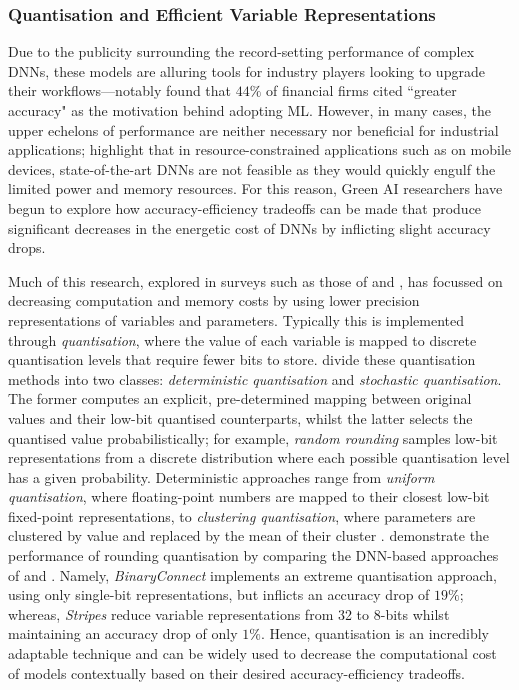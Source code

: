 \documentclass[a4paper, 11pt]{report}
\begin{document}
    \subsubsection{Quantisation and Efficient Variable Representations}
    \label{section: quantisation}

    Due to the publicity surrounding the record-setting performance of complex DNNs, these models are alluring tools for industry players looking to upgrade their workflows—notably \citet{chartis-2019} found that $44\%$ of financial firms cited ``greater accuracy" as the motivation behind adopting ML. However, in many cases, the upper echelons of performance are neither necessary nor beneficial for industrial applications; \citet{kumar-2020} highlight that in resource-constrained applications such as on mobile devices, state-of-the-art DNNs are not feasible as they would quickly engulf the limited power and memory resources. For this reason, Green AI researchers have begun to explore how accuracy-efficiency tradeoffs can be made that produce significant decreases in the energetic cost of DNNs by inflicting slight accuracy drops.

    Much of this research, explored in surveys such as those of \citet{xu-2021} and \citet{cai-2022}, has focussed on decreasing computation and memory costs by using lower precision representations of variables and parameters. Typically this is implemented through \emph{quantisation}, where the value of each variable is mapped to discrete quantisation levels that require fewer bits to store. \citet{xu-2021} divide these quantisation methods into two classes: \emph{deterministic quantisation} and \emph{stochastic quantisation}. The former computes an explicit, pre-determined mapping between original values and their low-bit quantised counterparts, whilst the latter selects the quantised value probabilistically; for example, \emph{random rounding} samples low-bit representations from a discrete distribution where each possible quantisation level has a given probability. Deterministic approaches range from \emph{uniform quantisation}, where floating-point numbers are mapped to their closest low-bit fixed-point representations, to \emph{clustering quantisation}, where parameters are clustered by value and replaced by the mean of their cluster \citep{xu-2021}. \citet{kumar-2020} demonstrate the performance of rounding quantisation by comparing the DNN-based approaches of \citet{courbariaux-2015} and \citet{judd-2016}. Namely, \emph{BinaryConnect} \citep{courbariaux-2015} implements an extreme quantisation approach, using only single-bit representations, but inflicts an accuracy drop of $19\%$; whereas, \emph{Stripes} \citep{judd-2016} reduce variable representations from 32 to 8-bits whilst maintaining an accuracy drop of only $1\%$. Hence, quantisation is an incredibly adaptable technique and can be widely used to decrease the computational cost of models contextually based on their desired accuracy-efficiency tradeoffs.
\end{document}
